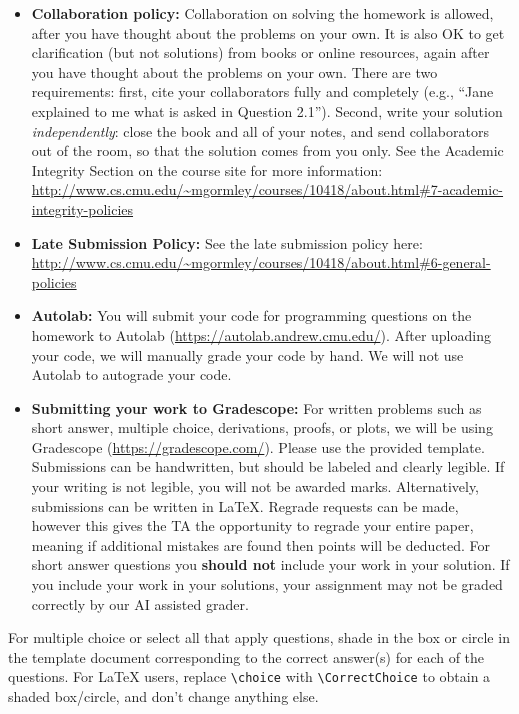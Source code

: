 \documentclass[11pt,addpoints,answers]{exam}
\numberwithin{equation}{section} %
\numberwithin{figure}{section} %
\numberwithin{table}{section} %
\begin{document}
\begin{itemize}
\item \textbf{Collaboration policy:} Collaboration on solving the homework is allowed, after you have thought about the problems on your own. It is also OK to get clarification (but not solutions) from books or online resources, again after you have thought about the problems on your own. There are two requirements: first, cite your collaborators fully and completely (e.g., ``Jane explained to me what is asked in Question 2.1''). Second, write your solution {\em independently}: close the book and all of your notes, and send collaborators out of the room, so that the solution comes from you only.  See the Academic Integrity Section on the course site for more information: \url{http://www.cs.cmu.edu/~mgormley/courses/10418/about.html#7-academic-integrity-policies}

\item\textbf{Late Submission Policy:} See the late submission policy here: \url{http://www.cs.cmu.edu/~mgormley/courses/10418/about.html#6-general-policies}


\item \textbf{Autolab:} You will submit your code for programming questions on the homework to Autolab (\url{https://autolab.andrew.cmu.edu/}). After uploading your code,
we will manually grade your code by hand. We will not use Autolab to autograde your code.

\item \textbf{Submitting your work to Gradescope:} For written problems such as short answer, multiple choice, derivations, proofs, or plots, we will be using Gradescope (\url{https://gradescope.com/}). Please use the provided template. Submissions can be handwritten, but should be labeled and clearly legible. If your writing is not legible, you will not be awarded marks. Alternatively, submissions can be written in LaTeX. Regrade requests can be made, however this gives the TA the opportunity to regrade your entire paper, meaning if additional mistakes are found then points will be deducted. For short answer questions you \textbf{should not} include your work in your solution.  If you include your work in your solutions, your assignment may not be graded correctly by our AI assisted grader. 

\end{itemize}

For multiple choice or select all that apply questions, shade in the box or circle in the template document corresponding to the correct answer(s) for each of the questions. For \LaTeX{} users, replace \lstinline{\choice} with \lstinline{\CorrectChoice} to obtain a shaded box/circle, and don't change anything else.
\end{document}
